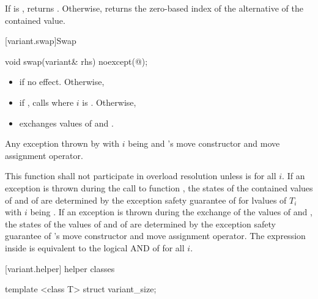 \begin{itemdescr}
\pnum
\effects
If  is , returns .
Otherwise, returns the zero-based index of the alternative of the contained value.
\end{itemdescr}

[variant.swap]{Swap}

%
\begin{itemdecl}
void swap(variant& rhs) noexcept(@\seebelow@);
\end{itemdecl}

\begin{itemdescr}
\pnum
\effects
\begin{itemize}
\item
if  no effect. Otherwise,
\item
if , calls  where $i$ is . Otherwise,
\item
exchanges values of  and .
\end{itemize}

\pnum
\throws
Any exception thrown by  with $i$
being  and 's move constructor and move assignment operator.

\pnum
\remarks
This function shall not participate in overload resolution unless
 is  for all $i$.
If an exception is thrown during the call to function ,
the states of the contained values of  and of  are
determined by the exception safety guarantee of  for lvalues of
$T_i$ with $i$ being .
If an exception is thrown during the exchange of the values of 
and , the states of the values of  and of 
are determined by the exception safety guarantee of 's move
constructor and move assignment operator.
The expression inside  is equivalent to the logical AND of
 for all $i$.
\end{itemdescr}

[variant.helper]{ helper classes}

%
\begin{itemdecl}
template <class T> struct variant_size;
\end{itemdecl}

